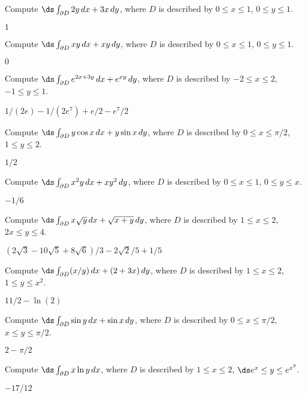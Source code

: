 \begin{exercises}

\exercise Compute $\ds\int_{\partial D} 2y\,dx + 3x\,dy$, 
where $D$ is described by $0\le x\le1$, $0\le y\le 1$.
\begin{answer} $1$
\end{answer}

\exercise Compute $\ds\int_{\partial D} xy\,dx + xy\,dy$, 
where $D$ is described by $0\le x\le1$, $0\le y\le 1$.
\begin{answer} $0$
\end{answer}

\exercise Compute $\ds\int_{\partial D} e^{2x+3y}\,dx + e^{xy}\,dy$, 
where $D$ is described by $-2\le x\le 2$, $-1\le y\le 1$.
\begin{answer} $1/(2e)-1/(2e^7)+e/2-e^7/2$
\end{answer}

\exercise Compute $\ds\int_{\partial D} y\cos x\,dx + y\sin x\,dy$, 
where $D$ is described by $0\le x\le \pi/2$, $1\le y\le 2$.
\begin{answer} $1/2$
\end{answer}

\exercise Compute $\ds\int_{\partial D} x^2y\,dx + xy^2\,dy$, 
where $D$ is described by $0\le x\le 1$, $0\le y\le x$.
\begin{answer} $-1/6$
\end{answer}

\exercise Compute $\ds\int_{\partial D} x\sqrt{y}\,dx + \sqrt{x+y}\,dy$, 
where $D$ is described by $1\le x\le 2$, $2x\le y\le 4$.
\begin{answer} $(2\sqrt3-10\sqrt5+8\sqrt6)/3-2\sqrt2/5+1/5$
\end{answer}

\exercise Compute $\ds\int_{\partial D} (x/y)\,dx + (2+3x)\,dy$, 
where $D$ is described by $1\le x\le 2$, $1\le y\le x^2$.
\begin{answer} $11/2-\ln(2)$
\end{answer}

\exercise Compute $\ds\int_{\partial D} \sin y\,dx + \sin x\,dy$, 
where $D$ is described by $0\le x\le \pi/2$, $x\le y\le \pi/2$.
\begin{answer} $2-\pi/2$
\end{answer}

\exercise Compute $\ds\int_{\partial D} x\ln y\,dx$,
where $D$ is described by $1\le x\le 2$, $\ds e^x\le y\le e^{x^2}$.
\begin{answer} $-17/12$
\end{answer}


\end{exercises}
